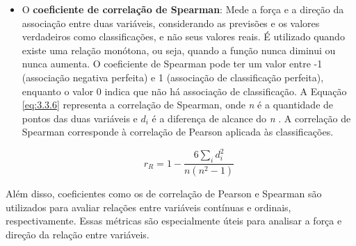 \begin{itemize}
    \item O \textbf{coeficiente de correlação de Spearman}: Mede a força e a direção da associação entre duas variáveis, considerando as previsões e os valores verdadeiros como classificações, e não seus valores reais. É utilizado quando existe uma relação monótona, ou seja, quando a função nunca diminui ou nunca aumenta. O coeficiente de Spearman pode ter um valor entre -1 (associação negativa perfeita) e 1 (associação de classificação perfeita), enquanto o valor 0 indica que não há associação de classificação. A Equação \ref{eq:3.3.6} representa a correlação de Spearman, onde \textit{n} é a quantidade de pontos das duas variáveis e \textit{$d_{i}$} é a diferença de alcance do \textit{n} \cite{mukaka2012}. A correlação de Spearman corresponde à correlação de Pearson aplicada às classificações.
    
    \begin{equation}
        r_{R} = 1 - \frac {6\sum_{i} d_{i}^2}{n(n^2-1)}
        \label{eq:3.3.6}
    \end{equation}
\end{itemize}

Além disso, coeficientes como os de correlação de Pearson e Spearman são utilizados para avaliar relações entre variáveis contínuas e ordinais, respectivamente. Essas métricas são especialmente úteis para analisar a força e direção da relação entre variáveis.

